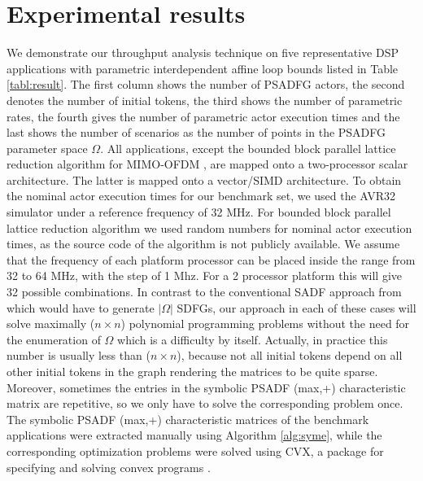 \documentclass[]{eptcs}
\begin{document}
\section{Experimental results}
We demonstrate our throughput analysis technique on five representative DSP applications with parametric interdependent affine loop bounds listed in Table \ref{tabl:result}. The first column shows the number of PSADFG actors, the second denotes the number of initial tokens, the third shows the number of parametric rates, the fourth gives the number of parametric actor execution times and the last shows the number of scenarios as the number of points in the PSADFG parameter space $\Omega$. All applications, except the bounded block parallel lattice reduction algorithm for MIMO-OFDM \cite{2ahmad:all}, are mapped onto a two-processor scalar architecture. The latter is mapped onto a vector/SIMD architecture. To obtain the nominal actor execution times for our benchmark set, we used the AVR32 \cite{2avr} simulator under a reference frequency of 32 $\mathrm{MHz}$. For bounded block parallel lattice reduction algorithm \cite{2ahmad:all} we used random numbers for nominal actor execution times, as the source code of the algorithm is not publicly available. We assume that the frequency of each platform processor can be placed inside the range from 32 to 64 $\mathrm{MHz}$, with the step of 1 $\mathrm{Mhz}$. For a 2 processor platform this will give 32 possible combinations. In contrast to the conventional SADF approach from \cite{2geil:all} which would have to generate $|\Omega|$ SDFGs, our approach in each of these cases will solve maximally ($n \times n$) polynomial programming problems without the need for the enumeration  of $\Omega$ which is a difficulty by itself. Actually, in practice this number is usually less than ($n \times n$), because not all initial tokens depend on all other initial tokens in the graph rendering the matrices to be quite sparse. Moreover, sometimes the entries in the symbolic PSADF (max,+) characteristic matrix are repetitive, so we only have to solve the corresponding problem once. The symbolic PSADF (max,+) characteristic matrices of the benchmark applications were extracted manually using Algorithm \ref{alg:syme}, while the corresponding optimization problems were solved using CVX, a package for specifying and solving convex programs \cite{cvx}\cite{gb08}.
\end{document}
